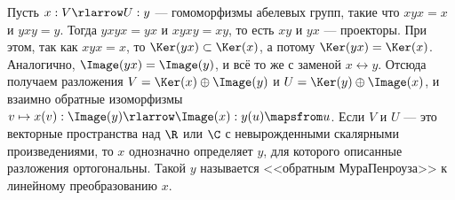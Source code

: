 \documentclass[
	extrafontsizes,
	11pt,
	hyphens,
]{memoir}
\begin{document}
\begin{observation}
Пусть \(x : V \rlarrow U : y\) --- гомоморфизмы абелевых групп, такие что \(xyx=x\) и \(yxy=y\).
Тогда \(yxyx=yx\) и \(xyxy=xy\), то есть \(xy\) и \(yx\) --- проекторы.
При этом, так как \(xyx=x\), то \(\Ker(yx) \subset \Ker(x)\), а потому \(\Ker(yx) = \Ker(x)\).
Аналогично, \(\Image(yx) = \Image(y)\), и всё то же с заменой \(x \leftrightarrow y\).
Отсюда получаем разложения \(V = \Ker(x) \oplus \Image(y)\) и \(U = \Ker(y) \oplus \Image(x)\),
и взаимно обратные изоморфизмы
\(v \mapsto x(v) : \Image(y) \rlarrow \Image(x) : y(u) \mapsfrom u\).
Если \(V\) и \(U\) --- это векторные пространства над \(\R\) или \(\C\) с невырожденными скалярными произведениями, то \(x\) однозначно определяет \(y\), для которого описанные разложения ортогональны. Такой \(y\) называется <<обратным Мура\namedash{}Пенроуза>> к линейному преобразованию \(x\).
\end{observation}





















\backmatter



\makeatletter
\renewcommand*{\toclevel@chapter}{-1}
\makeatother


\listoffigures


\printbibliography
\end{document}
